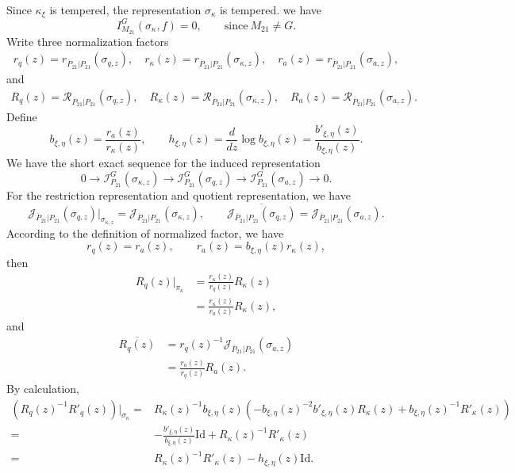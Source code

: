 \documentclass[11pt]{amsart}
\theoremstyle{definition}
\numberwithin{equation}{section}
\begin{document}
	
	Since \(\kappa_\xi\) is tempered, the representation \(\sigma_\kappa\) is tempered. we have \[I_{M_{21}}^G(\sigma_\kappa, f) = 0,\qquad \text{since}\ M_{21}\neq G.\]
    Write three normalization factors
    \[
    \begin{aligned}
    	r_q(z) = r_{\overline{P}_{21}|P_{21}}(\sigma_{q,z}), \quad
    	r_\kappa(z) = r_{\overline{P}_{21}|P_{21}}(\sigma_{\kappa,z}), \quad
    	r_a(z) = r_{\overline{P}_{21}|P_{21}}(\sigma_{a,z}),
    \end{aligned}
    \]and 
    \begin{align*}
    	R_q(z) = \mathscr{R}_{\overline{P}_{21}|P_{21}}(\sigma_{q,z}), \quad R_\kappa(z) = \mathscr{R}_{\overline{P}_{21}|P_{21}}(\sigma_{\kappa,z}), \quad R_a(z) = \mathscr{R}_{\overline{P}_{21}|P_{21}}(\sigma_{a,z}).
    \end{align*}
    Define
    \[
    b_{\xi,\eta}(z) = \frac{r_a(z)}{r_\kappa(z)},\qquad h_{\xi,\eta}(z) = \frac{d}{dz} \log b_{\xi,\eta}(z) = \frac{b'_{\xi,\eta}(z)}{b_{\xi,\eta}(z)}.
    \]We have the short exact sequence for the induced representation
    \[0 \longrightarrow \mathscr{I}_{P_{21}}^G(\sigma_{\kappa,z}) \longrightarrow \mathscr{I}_{P_{21}}^G(\sigma_{q,z}) \longrightarrow \mathscr{I}_{P_{21}}^G(\sigma_{a,z}) \longrightarrow 0.\]
   For the restriction representation and quotient representation, we have 
   \[\mathscr{J}_{\overline{P}_{21}|P_{21}}(\sigma_{q,z})|_{\sigma_{\kappa,z}}=\mathscr{J}_{\overline{P}_{21}|P_{21}}(\sigma_{\kappa,z}),\qquad \overline{\mathscr{J}_{\overline{P}_{21}|P_{21}}(\sigma_{q,z})}=\mathscr{J}_{\overline{P}_{21}|P_{21}}(\sigma_{a,z}).\]
	According to the definition of normalized factor, we have 
	\[r_q(z)=r_a(z),\qquad r_a(z)=b_{\xi,\eta}(z)r_{\kappa}(z),\]then 
	\begin{align*}
		R_q(z)|_{\pi_\kappa} &= \frac{r_\kappa(z)}{r_q(z)} R_\kappa(z) \\
		&= \frac{r_\kappa(z)}{r_a(z)} R_\kappa(z),
	\end{align*}and 
	\begin{align*}
		\overline{R_q(z)} &= r_q(z)^{-1} \mathscr{J}_{\overline{P}_{21}|P_{21}}(\sigma_{a,z}) \\
		&= \frac{r_a(z)}{r_q(z)} R_a(z).
	\end{align*}
	By calculation, 
	\begin{align*}
		\left(R_q(z)^{-1} R'_q(z)\right) \big|_{\sigma_\kappa}=& R_\kappa(z)^{-1} b_{\xi,\eta}(z) \left( -b_{\xi,\eta}(z)^{-2} b'_{\xi,\eta}(z) R_\kappa(z) + b_{\xi,\eta}(z)^{-1} R'_\kappa(z) \right) \\
		=& -\frac{b'_{\xi,\eta}(z)}{b_{\xi,\eta}(z)} \mathrm{Id} + R_\kappa(z)^{-1} R'_\kappa(z)\\
		=&R_\kappa(z)^{-1} R'_\kappa(z)-h_{\xi,\eta}(z)\mathrm{Id}.
	\end{align*}
\end{document}

